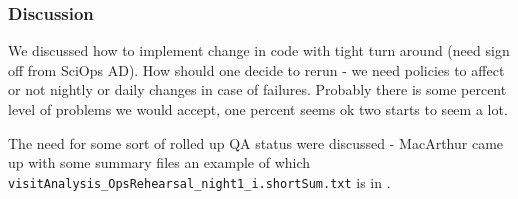\subsubsection{Discussion}
We discussed how to implement change in code with tight turn around (need sign off from SciOps \gls{AD}).
How should one decide to rerun -  we need policies to affect or not nightly or daily changes in case of failures. Probably there is some percent level of problems we would accept, one percent seems ok two starts to seem a lot.


The need for some sort of rolled up \gls{QA} status were discussed - MacArthur came up with some summary files an
example of which \texttt{visitAnalysis\_OpsRehearsal\_night1\_i.shortSum.txt} is in .


